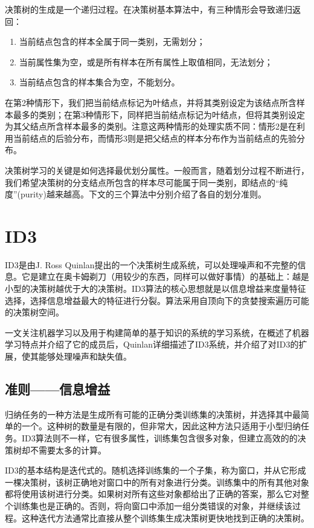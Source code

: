 \documentclass[fontset=windows]{article}
\begin{document}
决策树的生成是一个递归过程。在决策树基本算法中，有三种情形会导致递归返回：

\begin{enumerate}
      \item 当前结点包含的样本全属于同一类别，无需划分；
      \item 当前属性集为空，或是所有样本在所有属性上取值相同，无法划分；
      \item 当前结点包含的样本集合为空，不能划分。
\end{enumerate}

在第2种情形下，我们把当前结点标记为叶结点，并将其类别设定为该结点所含样本最多的类别；在第3种情形下，同样把当前结点标记为叶结点，但将其类别设定为其父结点所含样本最多的类别。注意这两种情形的处理实质不同：情形2是在利用当前结点的后验分布，而情形3则是把父结点的样本分布作为当前结点的先验分布。

决策树学习的关键是如何选择最优划分属性。一般而言，随着划分过程不断进行，我们希望决策树的分支结点所包含的样本尽可能属于同一类别，即结点的“纯度”(purity)越来越高。下文的三个算法中分别介绍了各自的划分准则。

\section{ID3}

ID3是由J. Ross Quinlan提出的一个决策树生成系统，可以处理噪声和不完整的信息。它是建立在奥卡姆剃刀（用较少的东西，同样可以做好事情）的基础上：越是小型的决策树越优于大的决策树。ID3算法的核心思想就是以信息增益来度量特征选择，选择信息增益最大的特征进行分裂。算法采用自顶向下的贪婪搜索遍历可能的决策树空间。

\cite[Induction of Decision Trees]{ref1}一文关注机器学习以及用于构建简单的基于知识的系统的学习系统，在概述了机器学习特点并介绍了它的成员后，Quinlan详细描述了ID3系统，并介绍了对ID3的扩展，使其能够处理噪声和缺失值。

\subsection{准则——信息增益}

归纳任务的一种方法是生成所有可能的正确分类训练集的决策树，并选择其中最简单的一个。这种树的数量是有限的，但非常大，因此这种方法只适用于小型归纳任务。ID3算法则不一样，它有很多属性，训练集包含很多对象，但建立高效的的决策树却不需要太多的计算。

ID3的基本结构是迭代式的。随机选择训练集的一个子集，称为窗口，并从它形成一棵决策树，该树正确地对窗口中的所有对象进行分类。训练集中的所有其他对象都将使用该树进行分类。如果树对所有这些对象都给出了正确的答案，那么它对整个训练集也是正确的。否则，将向窗口中添加一组分类错误的对象，并继续该过程。这种迭代方法通常比直接从整个训练集生成决策树更快地找到正确的决策树。
\end{document}
